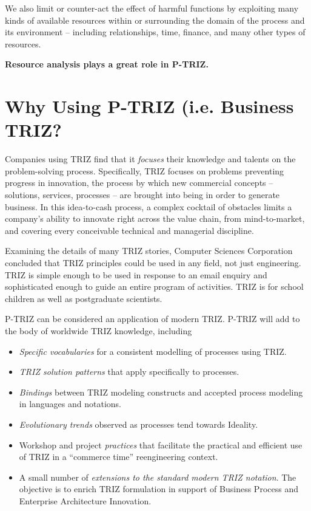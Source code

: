 \documentclass[11pt,a4paper]{article}
\begin{document}
We also limit or counter-act the effect of harmful functions by exploiting
many kinds of available resources within or surrounding the domain of the
process and its environment – including relationships, time, finance, and many
other types of resources.

\textbf{Resource analysis plays a great role in P-TRIZ.}

\section{Why Using P-TRIZ (i.e. Business TRIZ?}

Companies using TRIZ find that it \emph{focuses} their knowledge and talents
on the problem-solving process. Specifically, TRIZ focuses on problems
preventing progress in innovation, the process by which new commercial
concepts – solutions, services, processes – are brought into being in order to
generate business. In this idea-to-cash process, a complex cocktail of
obstacles limits a company’s ability to innovate right across the value chain,
from mind-to-market, and covering every conceivable technical and managerial
discipline.

Examining the details of many TRIZ stories, Computer Sciences Corporation
concluded that TRIZ principles could be used in any field, not just
engineering. TRIZ is simple enough to be used in response to an email enquiry
and sophisticated enough to guide an entire program of activities.  TRIZ is
for school children as well as postgraduate scientists.

P-TRIZ can be considered an application of modern TRIZ.  P-TRIZ will add to
the body of worldwide TRIZ knowledge, including
\begin{itemize}
\item \emph{Specific vocabularies} for a consistent modelling of processes
  using TRIZ.
\item \emph{TRIZ solution patterns} that apply specifically to processes. 
\item \emph{Bindings} between TRIZ modeling constructs and accepted process
  modeling in languages and notations.
\item \emph{Evolutionary trends} observed as processes tend towards Ideality.
\item Workshop and project \emph{practices} that facilitate the practical and
  efficient use of TRIZ in a “commerce time” reengineering context.
\item A small number of \emph{extensions to the standard modern TRIZ
  notation}.  The objective is to enrich TRIZ formulation in support of
  Business Process and Enterprise Architecture Innovation.
\end{itemize}
\end{document}
